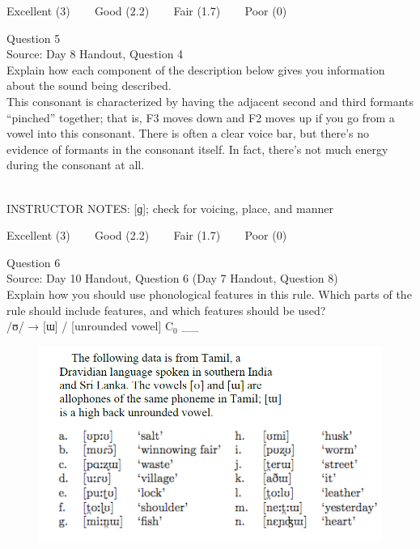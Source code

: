 \documentclass[12pt]{article}
\begin{document}
\vfill
Excellent (3) ~~~ Good (2.2) ~~~ Fair (1.7) ~~~ Poor (0)
\newpage

{\large Question 5}\\

Source: Day 8 Handout, Question 4\\

Explain how each component of the description below gives you information about the sound being described.\\

This consonant is characterized by having the adjacent second and third formants ``pinched'' together; that is, F3 moves down and F2 moves up if you go from a vowel into this consonant. There is often a clear voice bar, but there’s no evidence of formants in the consonant itself. In fact, there’s not much energy during the consonant at all.


~\\
INSTRUCTOR NOTES: [ɡ]; check for voicing, place, and manner


\vfill
Excellent (3) ~~~ Good (2.2) ~~~ Fair (1.7) ~~~ Poor (0)
\newpage

{\large Question 6}\\

Source: Day 10 Handout, Question 6 (Day 7 Handout, Question 8)\\

Explain how you should use phonological features in this rule. Which parts of the rule should include features, and which features should be used?\\

/ʊ/ → {[ɯ]} / {[unrounded vowel]} C$_0$ \_\_

\begin{figure}[H]
\includegraphics{../images/tamil.png}
\end{figure}
\end{document}
